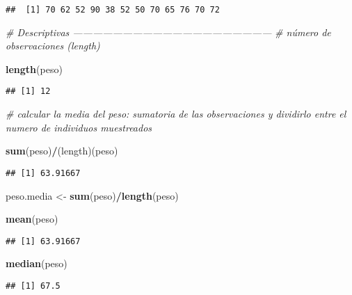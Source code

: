 \documentclass[
]{article}
\newenvironment{Shaded}{\begin{snugshade}}{\end{snugshade}}
\newcommand{\CommentTok}[1]{\textcolor[rgb]{0.56,0.35,0.01}{\textit{#1}}}
\newcommand{\KeywordTok}[1]{\textcolor[rgb]{0.13,0.29,0.53}{\textbf{#1}}}
\newcommand{\NormalTok}[1]{#1}
\newcommand{\OperatorTok}[1]{\textcolor[rgb]{0.81,0.36,0.00}{\textbf{#1}}}
\newcommand{\StringTok}[1]{\textcolor[rgb]{0.31,0.60,0.02}{#1}}
\begin{document}
\begin{verbatim}
##  [1] 70 62 52 90 38 52 50 70 65 76 70 72
\end{verbatim}

\begin{Shaded}
\begin{Highlighting}[]
\CommentTok{# Descriptivas ------------------------------------------------------------}
\CommentTok{# número de observaciones (length)}

 \KeywordTok{length}\NormalTok{(peso)}
\end{Highlighting}
\end{Shaded}

\begin{verbatim}
## [1] 12
\end{verbatim}

\begin{Shaded}
\begin{Highlighting}[]
 \CommentTok{# calcular la media del peso: sumatoria de las observaciones y dividirlo entre el numero de individuos muestreados}
 
 \KeywordTok{sum}\NormalTok{(peso)}\OperatorTok{/}\NormalTok{(length)(peso)}
\end{Highlighting}
\end{Shaded}

\begin{verbatim}
## [1] 63.91667
\end{verbatim}

\begin{Shaded}
\begin{Highlighting}[]
\NormalTok{ peso.media <-}\StringTok{ }\KeywordTok{sum}\NormalTok{(peso)}\OperatorTok{/}\KeywordTok{length}\NormalTok{(peso)}
 

 \KeywordTok{mean}\NormalTok{(peso)}
\end{Highlighting}
\end{Shaded}

\begin{verbatim}
## [1] 63.91667
\end{verbatim}

\begin{Shaded}
\begin{Highlighting}[]
 \KeywordTok{median}\NormalTok{(peso)}
\end{Highlighting}
\end{Shaded}

\begin{verbatim}
## [1] 67.5
\end{verbatim}
\end{document}
